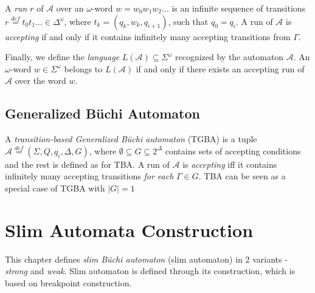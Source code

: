 \documentclass[
	digital
nolof, nolot
]{fithesis3}
\newcommand{\cA}{\mathcal{A}}
\newcommand{\lA}{L(\cA)}
\newcommand{\eqdef}{\overset{def}{=}}
\begin{document}
			A \emph{run} $r$ of $\cA$ over an $\omega$-word $w=w_0w_1w_2\ldots$ is an infinite sequence of transitions
			$r\eqdef t_0t_1\ldots\in\Delta^\omega$, where $t_k=(q_k, w_k,q_{i+1})$,
			 such that $q_0=q_i$.
			A run of $\cA$ is \emph{accepting} if and only if it contains infinitely many accepting transitions from $\Gamma$.

			Finally, we define the \emph{language} $\lA \subseteq \Sigma^\omega$ recognized by the automaton $\cA$. An $\omega$-word $w \in \Sigma^\omega$ belongs to $\lA$ if and only if there exists an accepting run of $\cA$ over the word $w$. 
			
			
		\section{Generalized Büchi Automaton}
		A \emph{transition-based Generalized Büchi automaton} (TGBA) is a tuple $\cA\eqdef(\Sigma, Q, q_i, \Delta, G)$, where $\emptyset \subseteq G \subseteq 2^\Delta$ contains sets of accepting conditions and the rest is defined as for TBA. A run of $\cA$ is \emph{accepting} iff it contains infinitely many accepting transitions \emph{for each} $\Gamma \in G$. TBA can be seen as a special case of TGBA with $|G|=1$
		
		
			
			
			
			\chapter{Slim Automata Construction}\label{section:slim}
			
			
			
			
			
			
			
			
			
			
			This chapter defines \emph{slim Büchi automaton} (slim automaton) in 2 variants - \emph{strong} and \emph{weak}. Slim automaton is defined through its construction, which is based on breakpoint construction. 
			
\end{document}

